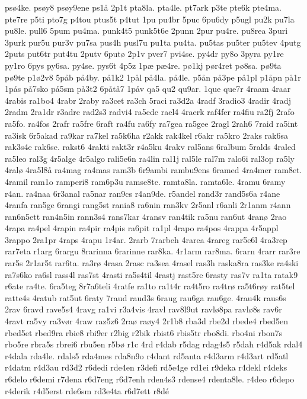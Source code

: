 {psø4ke.
psøy8
psøy9ene
ps1å
2p1t
pta8la.
pta4le.
pt7ark
p3te
pte6k
pte4ma.
pte7re
p5ti
pto7g
p4tou
ptus5t
p4tut
1pu
pu4br
5puc
6pu6dy
p5ugl
pu2k
pu7la
pu8le.
pull6
5pum
pu4ma.
punk4t5
punk5t6e
2punn
2pur
pu4re.
pu8rea
3puri
3purk
pur5u
pur3v
pu7sa
pus4h
pusl7u
pu1ta
pu4ta.
pu5tas
pu5ter
pu5tev
4putg
2puts
put6tr
put4tu
2putv
6putø
2p1v
pver7
pvi4se.
py4dr
py8o
3pyra
py1re
py1ro
6pys
py6sa.
py4se.
pys6t
4p5z
1pæ
pæ4re.
pø1kj
pør4ret
pø8sa.
pø9ta
pø9te
p1ø2v8
5påb
på4by.
på1k2
1pål
på4la.
på4le.
p5ån
på3pe
på1pl
p1åpn
på1r
1pås
på7sko
på5sm
på3t2
6påtå7
1påv
qa5
qu2
qu9ar.
1que
que7r
4raam
4raar
4rabis
ra1bo4
4rabr
2raby
ra3cet
ra3ch
5raci
ra3d2a
4radf
3radio3
4radir
4radj
2radm
2ra1dr
r3adre
rad2s3
radvi4
ra5ede
rael4
4raerk
raf4fer
ra4fiu
ra2fj
2rafo
ra5fo.
ra4fos
2rafr
ra5fre
6raft
ra4fu
ra6fy
ra7gea
ra5gee
2ragl
2rah6
7raid
ra5int
ra3isk
6r5akad
ra9kar
ra7kel
ra5k6ha
r2akk
rak4kel
r6akr
ra5kro
2raks
rak6sa
rak3s4e
rak6se.
rakst6
4rakti
rakt3r
r4a5ku
4rakv
ral5ans
6ralbum
5ralds
4raled
ra5leo
ral3g
4r5alge
4r5algo
rali5e6n
ra4lin
ral1j
ral5le
ral7m
ralo6i
ral3op
ra5ly
4ralø
4ra5l8å
ra4mag
ra4mas
ram3b
6r9ambi
rambu9ens
6ramed
4ra4mer
ram8et.
4ramil
ram1o
ramperi8
ram6p3u
ramse8te.
ramta8la.
ramta6le.
4ramu
6ramy
r4an.
ra4naa
6r3anal
ra5nar
ran9cs
r4an9de.
r5andel
rand3r
rand5s6a
r4ane
4ranfa
ran5ge
6rangi
rang5st
rania8
ra6nin
ran3kv
2r5anl
r6anli
2r1anm
r4ann
ran6n5ett
ran4n5in
rann3s4
rans7kar
4ransv
ran4tik
ra5nu
ran6ut
4ranø
2rao
4rapa
ra4pel
4rapin
ra4pir
ra4pis
ra6pit
ra1pl
4rapo
ra4pos
4rappa
4r5appl
3rappo
2ra1pr
4raps
4rapu
1r4ar.
2rarb
7rarbeh
4rarea
4rareg
rar5e6l
4ra3rep
rar7eta
r1arg
6rargu
8rarinna
6rarinne
rar8ka.
4r1arm
rar8ma.
6rarn
4rarr
rar3re
rar5s
2r1ar5t
rar6ta.
ra3rø
4rasa
2rasc
ra3sea
4rasel
ras3h
raska8ra
ras3ke
ra4ski
ra7s6ko
ra6sl
rass4l
ras7st
4rasti
ra5s4til
4rastj
rast5re
6rasty
ras7v
ra1ta
ratak9
r6ate
ra4te.
6ra5teg
8r7a6teli
4ratfe
ra1to
ra1t4r
ra4t5ro
ra4trø
ra5t6røy
rat5tel
ratte4s
4ratub
rat5ut
6raty
7raud
raud3s
6raug
rau6ga
rau6ge.
4rau4k
raus6s
2rav
6ravd
rave5s4
4ravg
ra1vi
r3a4vis
4ravl
rav8l9ut
ravlø8pa
ravlø8s
rav6r
4ravt
ra5vy
ra3vør
4raw
raz5z6
2raø
raøy4
2r1b8
rba3d
rbe2d
rbede4
rbed5en
rbed5et
rbed9ra
rbie8
rbi9er
r2big
r2bik
rbist6
rbis5tr
rbo8di.
rbo4ni
rbon7s
rbo5re
rbra5s
rbrei6
rbu5en
r5bø
r1c
4rd
r4dab
r5dag
rdag4s5
r5dah
r4d5ak
rdal4
r4dala
rda4le.
rdals5
rda4mes
rda8n9o
r4dant
rd5anta
r4d3arm
r4d3art
rd5atl
r4datm
r4d3au
rd3d2
r6dedi
rde4en
r3defi
rd5e4ge
rd1ei
r9deka
r4dekl
r4deks
r6delo
r6demi
r7dena
r6d7eng
r6d7enh
rden4s3
rdense4
rdenta8le.
r4deo
r6depo
r4derik
r4d5erst
rde6sm
rd3e4ta
r6d7ett
r8dé
}
